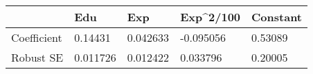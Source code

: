 \begin{tabular}{lllll}
& Edu & Exp & Exp\^{}2/100 & Constant \\ 
\hline 
Coefficient & 0.14431 & 0.042633 & -0.095056 & 0.53089 \\ 
Robust SE & 0.011726 & 0.012422 & 0.033796 & 0.20005 \\ 
\hline 
\end{tabular}
